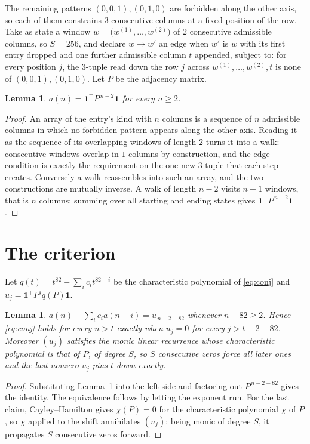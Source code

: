 \documentclass[11pt,a4paper]{article}
\theoremstyle{plain}
\newtheorem{lemma}[theorem]{Lemma}
\theoremstyle{definition}
\begin{document}
The remaining patterns $(0,0,1), (0,1,0)$ are forbidden along the other axis, so each of them
constrains $3$ consecutive columns at a fixed position of the row. Take as state a
window $w=\bigl(w^{(1)},\dots,w^{(2)}\bigr)$ of $2$ consecutive admissible
columns, so $S=256$, and declare $w\to w'$ an edge when $w'$ is $w$ with its first entry
dropped and one further admissible column $t$ appended, subject to: for every position
$j$, the $3$-tuple read down the row $j$ across $w^{(1)},\dots,w^{(2)},t$
is none of $(0,0,1), (0,1,0)$. Let $P$ be the adjacency matrix.

\begin{lemma}\label{lem:walk}
$a(n)=\mathbf{1}^{\!\top}P^{\,n-2}\mathbf{1}$ for every $n\ge2$.
\end{lemma}

\begin{proof}
An array of the entry's kind with $n$ columns is a sequence of $n$ admissible columns in
which no forbidden pattern appears along the other axis. Reading it as the sequence of its
overlapping windows of length $2$ turns it into a walk: consecutive windows overlap in
$1$ columns by construction, and the edge condition is exactly the requirement on the one
new $3$-tuple that each step creates. Conversely a walk reassembles into such an array,
and the two constructions are mutually inverse. A walk of length $n-2$ visits $n-1$
windows, that is $n$ columns; summing over all starting and ending states gives
$\mathbf{1}^{\!\top}P^{\,n-2}\mathbf{1}$.
\end{proof}

\section{The criterion}

Let $q(t)=t^{82}-\sum_i c_i t^{82-i}$ be the characteristic polynomial of
\eqref{eq:conj} and $u_j=\mathbf{1}^{\!\top}P^{j}q(P)\mathbf{1}$.

\begin{lemma}\label{lem:crit}
$a(n)-\sum_i c_i a(n-i)=u_{\,n-2-82}$ whenever $n-82\ge2$. Hence
\eqref{eq:conj} holds for every $n>t$ exactly when $u_j=0$ for every
$j>t-2-82$. Moreover $(u_j)$ satisfies the monic linear recurrence whose
characteristic polynomial is that of $P$, of degree $S$, so $S$ consecutive zeros force all
later ones and the last nonzero $u_j$ pins $t$ down exactly.
\end{lemma}

\begin{proof}
Substituting Lemma~\ref{lem:walk} into the left side and factoring out
$P^{\,n-2-82}$ gives the identity. The equivalence follows by letting the exponent
run. For the last claim, Cayley--Hamilton gives $\chi(P)=0$ for the characteristic
polynomial $\chi$ of $P$, so $\chi$ applied to the shift annihilates $(u_j)$; being monic of
degree $S$, it propagates $S$ consecutive zeros forward.
\end{proof}
\end{document}
